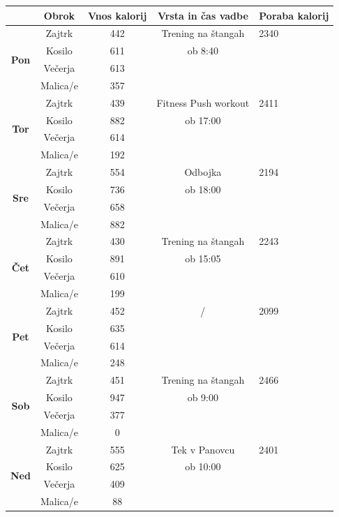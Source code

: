 \documentclass{article}
\begin{document}
\begin{tabularx}{\textwidth}{|c|c|c|c|X|}
  \hline
  & \textbf{Obrok} & \textbf{Vnos kalorij} & \textbf{Vrsta in čas vadbe} & \textbf{Poraba kalorij} \\
  \hline
  \multirow{4}{*}{\textbf{Pon}} & Zajtrk & 442 & Trening na štangah & 2340 \\
                                & Kosilo & 611 & ob 8:40 & \\
                                & Večerja & 613 & & \\
                                & Malica/e & 357 & & \\
  \hline
  \multirow{4}{*}{\textbf{Tor}} & Zajtrk & 439 & Fitness Push workout & 2411 \\
                                & Kosilo & 882 & ob 17:00 & \\
                                & Večerja & 614 & & \\
                                & Malica/e & 192 & & \\
  \hline
  \multirow{4}{*}{\textbf{Sre}} & Zajtrk & 554 & Odbojka & 2194 \\
                                & Kosilo & 736 & ob 18:00 & \\
                                & Večerja & 658 & & \\
                                & Malica/e & 882 & & \\
  \hline
  \multirow{4}{*}{\textbf{Čet}} & Zajtrk & 430 & Trening na štangah & 2243 \\
                                & Kosilo & 891 & ob 15:05 & \\
                                & Večerja & 610 & & \\
                                & Malica/e & 199 & & \\
  \hline
  \multirow{4}{*}{\textbf{Pet}} & Zajtrk & 452 & / & 2099 \\
                                & Kosilo & 635 & & \\
                                & Večerja & 614 & & \\
                                & Malica/e & 248 & & \\
  \hline
  \multirow{4}{*}{\textbf{Sob}} & Zajtrk & 451 & Trening na štangah & 2466 \\
                                & Kosilo & 947 & ob 9:00 & \\
                                & Večerja & 377 & & \\
                                & Malica/e & 0 & & \\
  \hline
  \multirow{4}{*}{\textbf{Ned}} & Zajtrk & 555 & Tek v Panovcu & 2401 \\
                                & Kosilo & 625 & ob 10:00 & \\
                                & Večerja & 409 & & \\
                                & Malica/e & 88 & & \\
  \hline                                     
\end{tabularx}
\end{document}
